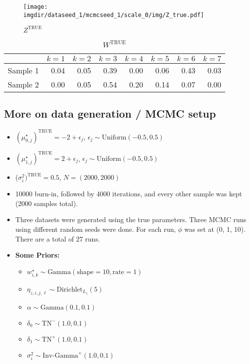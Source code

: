 \documentclass[10pt]{article} %
\newcommand{\Gam}{ \text{Gamma} }
\newcommand{\InvGamma}{ \text{Inv-Gamma} }
\newcommand{\Uniform}{ \text{Uniform} }
\def\Dir{\text{Dirichlet}}
\def\TN{\text{TN}}
\def\true{\text{TRUE}}
\def\imgdir{../../results/test-sim-6-6/}
\begin{document}
\begin{figure}[H]
  \begin{center}  %
    \texttt{[image: \\imgdir/dataseed\_1/mcmcseed\_1/scale\_0/img/Z\_true.pdf]}
  \end{center}
  \caption{$Z^\true$}
  \label{fig:Z-true}
\end{figure}

\begin{table}[ht]
  \centering
  \begin{tabular}{rrrrrrrr}
    \hline
    & $k=1$ & $k=2$ & $k=3$ & $k=4$ & $k=5$ & $k=6$ & $k=7$ \\
    \hline
    Sample 1 & 0.04 & 0.05 & 0.39 & 0.00 & 0.06 & 0.43 & 0.03 \\
    Sample 2 & 0.00 & 0.05 & 0.54 & 0.20 & 0.14 & 0.07 & 0.00 \\
    \hline
  \end{tabular}
  \caption{$W^\true$}
  \label{tab:W-true}
\end{table}

\subsection{More on data generation / MCMC setup}
\begin{itemize}
  \item $(\mu_{0,j}^\star)^\true=-2 + \epsilon_j$, $\epsilon_j \sim \Uniform(-0.5, 0.5)$
  \item $(\mu_{1,j}^\star)^\true=2 + \epsilon_j$, $\epsilon_j \sim \Uniform(-0.5, 0.5)$
  \item ($\sigma^2_i)^\true=0.5$, $N=(2000, 2000)$
  \item 10000 burn-in, followed by 4000 iterations, and every other sample was
    kept (2000 samples total).
  \item Three datasets were generated using the true parameters. Three MCMC runs using 
    different random seeds were done. For each run, $\phi$ was set at (0, 1, 10). There
    are a total of 27 runs.
  \item \textbf{Some Priors:}
  \begin{itemize}
    \item $w^\star_{i,k} \sim \Gam(\text{shape}=10, \text{rate}=1)$
    \item $\eta_{z, i,j,\ell} \sim \Dir_{L_z}(5)$
    \item $\alpha \sim \Gam(0.1, 0.1)$
    \item $\delta_0 \sim \TN^-(1.0, 0.1)$
    \item $\delta_1 \sim \TN^+(1.0, 0.1)$
    \item $\sigma^2_i \sim \InvGamma^+(1.0, 0.1)$
  \end{itemize}
\end{itemize}
\end{document}
